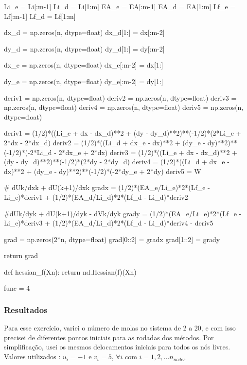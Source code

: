 \documentclass[10pt, a4paper]{article}
\begin{document}
\begin{python}
      Li_e = Li[:m-1]
      Li_d = Li[1:m]
      EA_e = EA[:m-1]
      EA_d = EA[1:m]
      Lf_e = Lf[:m-1]
      Lf_d = Lf[1:m]
      
      dx_d = np.zeros(n, dtype=float)   
      dx_d[1:] = dx[:m-2]
      
      dy_d = np.zeros(n, dtype=float)  
      dy_d[1:] = dy[:m-2]
      
      dx_e = np.zeros(n, dtype=float)
      dx_e[:m-2] = dx[1:]
      
      dy_e = np.zeros(n, dtype=float)
      dy_e[:m-2] = dy[1:]
      
      deriv1 = np.zeros(n, dtype=float)
      deriv2 = np.zeros(n, dtype=float)
      deriv3 = np.zeros(n, dtype=float)
      deriv4 = np.zeros(n, dtype=float)
      deriv5 = np.zeros(n, dtype=float)
        
      deriv1 = (1/2)*((Li_e + dx - dx_d)**2 + (dy - dy_d)**2)**(-1/2)*(2*Li_e + 2*dx - 2*dx_d)        
      deriv2 = (1/2)*((Li_d + dx_e - dx)**2 + (dy_e - dy)**2)**(-1/2)*(-2*Li_d - 2*dx_e + 2*dx)    
      deriv3 = (1/2)*((Li_e + dx - dx_d)**2 + (dy - dy_d)**2)**(-1/2)*(2*dy - 2*dy_d)
      deriv4 = (1/2)*((Li_d + dx_e - dx)**2 + (dy_e - dy)**2)**(-1/2)*(-2*dy_e + 2*dy)
      deriv5 = W    
      
      # dUk/dxk + dU(k+1)/dxk
      gradx = (1/2)*(EA_e/Li_e)*2*(Lf_e - Li_e)*deriv1 + (1/2)*(EA_d/Li_d)*2*(Lf_d - Li_d)*deriv2
      
      #dUk/dyk + dU(k+1)/dyk - dVk/dyk
      grady = (1/2)*(EA_e/Li_e)*2*(Lf_e - Li_e)*deriv3 + (1/2)*(EA_d/Li_d)*2*(Lf_d - Li_d)*deriv4 - deriv5
      
      grad = np.zeros(2*n, dtype=float)
      grad[0::2] = gradx
      grad[1::2] = grady
          
      return grad

  def hessian_f(Xn):
      return nd.Hessian(f)(Xn)

  func = 4

\end{python}


\subsubsection{Resultados}

Para esse exercício, variei o número de molas no sistema de 2 a 20, e com isso precisei de
diferentes pontos iniciais para as rodadas dos métodos. Por simplificação, usei os mesmos delocamentos iniciais para 
todos os nós livres. Valores utilizados : $u_i = -1$ e $v_i = 5$, $\forall i$ com $i=1,2,...n_{nodes}$ 
\end{document}
